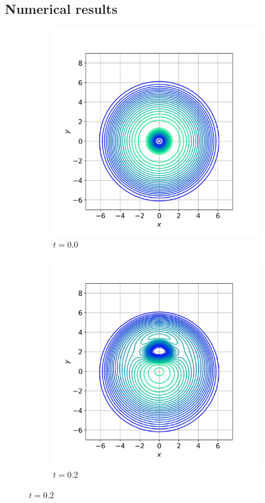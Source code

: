 \documentclass{article}
\begin{document}
\subsection{Numerical results}

\begin{figure}
\centering

\begin{subfigure}[b]{.45\linewidth}
\includegraphics[width=\linewidth]{imgs/vortex_contour/contour_vortices_0.jpeg}
\caption{$t = 0.0$}\label{fig:gull}
\end{subfigure}
\begin{subfigure}[b]{.45\linewidth}
\includegraphics[width=\linewidth]{imgs/vortex_contour/contour_vortices_20.jpeg}
\caption{$t = 0.2$}\label{fig:tiger}
\end{subfigure}


\end{figure}
\end{document}
